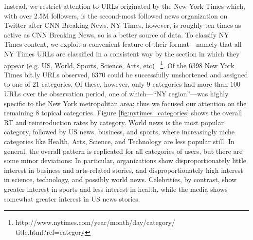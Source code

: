 \documentclass[phd,tocprelim]{cornell}
\begin{document}
Instead, we restrict attention to URLs originated by the New York Times
which, with over 2.5M followers, is the second-most followed news
organization on Twitter after CNN Breaking News. NY Times, however, is
roughly ten times as active as CNN Breaking News, so is a better source of
data. To classify NY Times content, we exploit a convenient feature of
their format---namely that all NY Times URLs are classified in a consistent
way by the section in which they appear (e.g. US, World, Sports, Science,
Arts, etc)
~\footnote{http://www.nytimes.com/year/month/day/category/\\title.html?ref=category}.
Of the 6398 New York Times bit.ly URLs observed, 6370 could be successfully
unshortened and assigned to one of 21 categories. Of these, however, only 9
categories had more than 100 URLs over the observation period, one of
which---``NY region''---was highly specific to the New York metropolitan
area; thus we focused our attention on the remaining 8 topical categories.
Figure \ref{fig:nytimes_categories} shows the overall RT and reintroduction
rates by category. World news is the most popular category, followed by US
news, business, and sports, where increasingly niche categories like
Health, Arts, Science, and Technology are less popular still.  In general,
the overall pattern is replicated for all categories of users, but there
are some minor deviations: In particular, organizations show
disproportionately little interest in business and arts-related stories,
and disproportionately high interest in science, technology, and possibly
world news. Celebrities, by contrast, show greater interest in sports and
less interest in health, while the media shows somewhat greater interest in
US news stories.

\end{document}
